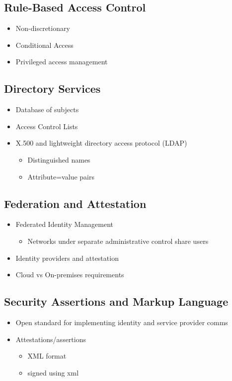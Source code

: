 	\subsection {Rule-Based Access Control}
		\begin{itemize}
			\item Non-discretionary
			\item Conditional Access
			\item Privileged access management
		\end{itemize}
	\subsection {Directory Services}
		\begin{itemize}
			\item Database of subjects
			\item Access Control Lists
			\item X.500 and lightweight directory access protocol (LDAP)
				\begin{itemize}
					\item Distinguished names
					\item Attribute=value pairs
				\end{itemize}
		\end{itemize}
	\subsection {Federation and Attestation}
		\begin{itemize}
			\item Federated Identity Management
				\begin{itemize}			
					\item Networks under separate administrative control share users
				\end{itemize}
			\item Identity providers and attestation
			\item Cloud vs On-premises requirements
		\end{itemize}
	\subsection {Security Assertions and Markup Language}
		\begin{itemize}
			\item Open standard for implementing identity and service provider comms
			\item Attestations/assertions
				\begin{itemize}
					\item XML format
					\item signed using xml 
				\end{itemize}
		\end{itemize}
